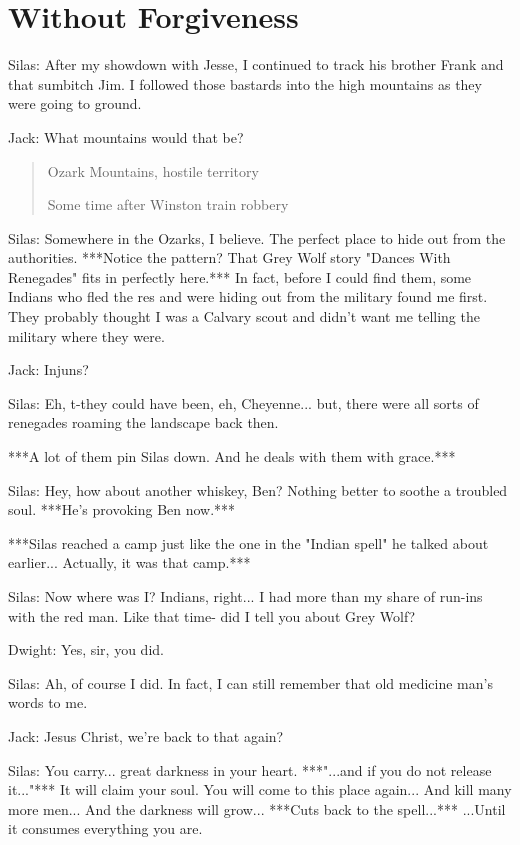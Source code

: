 \documentclass{article}
\begin{document}
\section*{Without Forgiveness}

Silas: After my showdown with Jesse, I continued to track his brother Frank and that sumbitch Jim. I followed those bastards into the high mountains as they were going to ground.

Jack: What mountains would that be?

\begin{quote}
    Ozark Mountains, hostile territory
    
    Some time after Winston train robbery
\end{quote}

Silas: Somewhere in the Ozarks, I believe. The perfect place to hide out from the authorities. ***Notice the pattern? That Grey Wolf story "Dances With Renegades" fits in perfectly here.*** In fact, before I could find them, some Indians who fled the res and were hiding out from the military found me first. They probably thought I was a Calvary scout and didn't want me telling the military where they were.

Jack: Injuns?

Silas: Eh, t-they could have been, eh, Cheyenne... but, there were all sorts of renegades roaming the landscape back then.

***A lot of them pin Silas down. And he deals with them with grace.***

Silas: Hey, how about another whiskey, Ben? Nothing better to soothe a troubled soul. ***He's provoking Ben now.***

***Silas reached a camp just like the one in the "Indian spell" he talked about earlier... Actually, it was that camp.***

Silas: Now where was I? Indians, right... I had more than my share of run-ins with the red man. Like that time- did I tell you about Grey Wolf?

Dwight: Yes, sir, you did.

Silas: Ah, of course I did. In fact, I can still remember that old medicine man's words to me.

Jack: Jesus Christ, we're back to that again?

Silas: You carry... great darkness in your heart. ***"...and if you do not release it..."*** It will claim your soul. You will come to this place again... And kill many more men... And the darkness will grow... ***Cuts back to the spell...*** ...Until it consumes everything you are.
\end{document}
